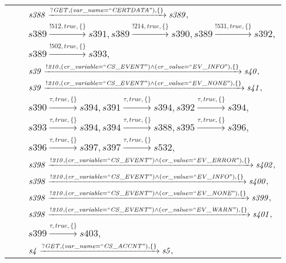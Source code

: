\begin{tabular}{lcl}
& & $\mathit{s388}\xrightarrow{\mathit{?GET}, \mathit{(var\_name = ``CERTDATA")}, \{\}}\mathit{s389},$ \\
& & $\mathit{s389}\xrightarrow{\mathit{!512}, \mathit{true}, \{\}}\mathit{s391},\mathit{s389}\xrightarrow{\mathit{!214}, \mathit{true}, \{\}}\mathit{s390},\mathit{s389}\xrightarrow{\mathit{!531}, \mathit{true}, \{\}}\mathit{s392},$ \\
& & $\mathit{s389}\xrightarrow{\mathit{!502}, \mathit{true}, \{\}}\mathit{s393},$ \\
& & $\mathit{s39}\xrightarrow{\mathit{!210}, \mathit{(cr\_variable = ``CS\_EVENT") \land (cr\_value = ``EV\_INFO")}, \{\}}\mathit{s40},$ \\
& & $\mathit{s39}\xrightarrow{\mathit{!210}, \mathit{(cr\_variable = ``CS\_EVENT") \land (cr\_value = ``EV\_NONE")}, \{\}}\mathit{s41},$ \\
& & $\mathit{s390}\xrightarrow{\mathit{\tau}, \mathit{true}, \{\}}\mathit{s394},\mathit{s391}\xrightarrow{\mathit{\tau}, \mathit{true}, \{\}}\mathit{s394},\mathit{s392}\xrightarrow{\mathit{\tau}, \mathit{true}, \{\}}\mathit{s394},$ \\
& & $\mathit{s393}\xrightarrow{\mathit{\tau}, \mathit{true}, \{\}}\mathit{s394},\mathit{s394}\xrightarrow{\mathit{\tau}, \mathit{true}, \{\}}\mathit{s388},\mathit{s395}\xrightarrow{\mathit{\tau}, \mathit{true}, \{\}}\mathit{s396},$ \\
& & $\mathit{s396}\xrightarrow{\mathit{\tau}, \mathit{true}, \{\}}\mathit{s397},\mathit{s397}\xrightarrow{\mathit{\tau}, \mathit{true}, \{\}}\mathit{s532},$ \\
& & $\mathit{s398}\xrightarrow{\mathit{!210}, \mathit{(cr\_variable = ``CS\_EVENT") \land (cr\_value = ``EV\_ERROR")}, \{\}}\mathit{s402},$ \\
& & $\mathit{s398}\xrightarrow{\mathit{!210}, \mathit{(cr\_variable = ``CS\_EVENT") \land (cr\_value = ``EV\_INFO")}, \{\}}\mathit{s400},$ \\
& & $\mathit{s398}\xrightarrow{\mathit{!210}, \mathit{(cr\_variable = ``CS\_EVENT") \land (cr\_value = ``EV\_NONE")}, \{\}}\mathit{s399},$ \\
& & $\mathit{s398}\xrightarrow{\mathit{!210}, \mathit{(cr\_variable = ``CS\_EVENT") \land (cr\_value = ``EV\_WARN")}, \{\}}\mathit{s401},$ \\
& & $\mathit{s399}\xrightarrow{\mathit{\tau}, \mathit{true}, \{\}}\mathit{s403},$ \\
& & $\mathit{s4}\xrightarrow{\mathit{?GET}, \mathit{(var\_name = ``CS\_ACCNT")}, \{\}}\mathit{s5},$ \\

\end{tabular}
